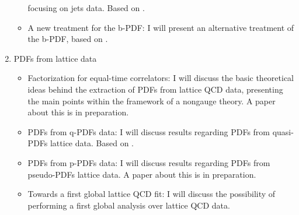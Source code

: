 \begin{enumerate}
\begin{itemize}
        focusing on jets data. Based on \cite{AbdulKhalek:2020jut}.     
        \item A new treatment for the b-PDF: I will present an alternative treatment of the b-PDF, based on \cite{Forte:2019hjc}.
    \end{itemize}
    \item PDFs from lattice data
    \begin{itemize}
        \item Factorization for equal-time correlators: 
        I will discuss the basic theoretical ideas behind the extraction of PDFs from lattice QCD data, presenting
        the main points within the framework of a nongauge theory.
        A paper about this is in preparation.
        \item PDFs from q-PDFs data: I will discuss results regarding PDFs from quasi-PDFs lattice data. Based on \cite{Cichy2019}.
        \item PDFs from p-PDFs data: I will discuss results regarding PDFs from pseudo-PDFs lattice data. 
        A paper about this is in preparation.
        \item Towards a first global lattice QCD fit: I will discuss the possibility of performing a first global analysis 
        over lattice QCD data.
    \end{itemize}
\end{enumerate}